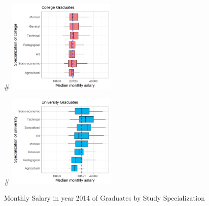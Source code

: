 \documentclass[alpha-refs]{wiley-article-05g}
\begin{document}
\begin{figure}[htbp!]
	\begin{minipage}[b]{.5\linewidth}
		\centering
		#\hspace*{-0.2in}
		\includegraphics[width=150pt]{sal_spnc.png}
	\end{minipage}
	\hfill
	\begin{minipage}[b]{.5\linewidth}
		\centering
		#\hspace*{-0.2in}
		\includegraphics[width=150pt]{sal_spnu.png}
	\end{minipage}
	\caption{Monthly Salary in year 2014 of Graduates by Study Specialization}\label{fig:1.6}
\end{figure}
\end{document}
